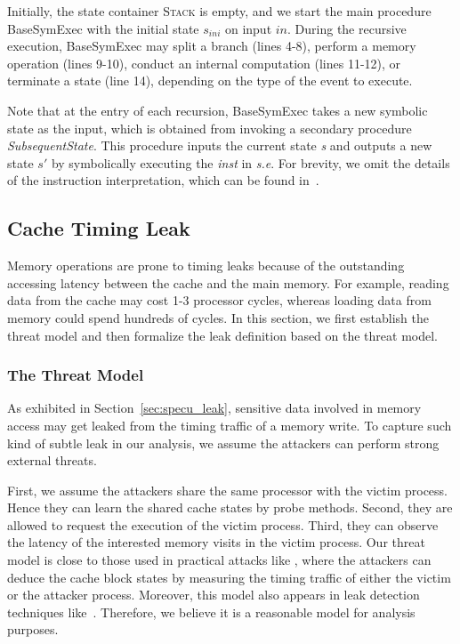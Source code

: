 \documentclass[sigconf,screen]{acmart}
\newcommand{\SymExec}{\textsf{BaseSymExec} }
\begin{document}
Initially, the state container \textsc{Stack} is empty, and we start the main 
procedure \SymExec with the initial state $\mathit{s_{ini}}$ on input $\mathit{in}$.
During the recursive execution, \SymExec may split a branch (lines 4-8), perform 
a memory operation (lines 9-10), conduct an internal computation (lines 11-12), 
or terminate a state (line 14), depending on the type of the event to execute.


Note that at the entry of each recursion, \SymExec takes a new symbolic state 
as the input, which is obtained from invoking a secondary procedure 
\textit{SubsequentState}. This procedure inputs the current state \textit{s} 
and outputs a new state $s'$ by symbolically executing the \textit{inst} in 
\textit{s.e}. For brevity, we omit the details of the instruction interpretation, 
which can be found in~\cite{CadarDE08,PasareanuR10}.



\subsection{Cache Timing Leak}
\label{sec:leak}

Memory operations are prone to timing leaks because of the outstanding accessing 
latency between the cache and the main memory. For example, reading data from the 
cache may cost 1-3 processor cycles, whereas loading data from memory could spend 
hundreds of cycles. In this section, we first establish the threat model and then 
formalize the leak definition based on the threat model.


\subsubsection{The Threat Model}
\label{sec:threat}

As exhibited in Section~\ref{sec:specu_leak}, sensitive data involved in memory 
access may get leaked from the timing traffic of a memory write. To capture such 
kind of subtle leak in our analysis, we assume the attackers can perform strong 
external threats. 


First, we assume the attackers share the same processor with the victim process. 
Hence they can learn the shared cache states by probe methods. Second, they are 
allowed to request the execution of the victim process. Third, they can observe 
the latency of the interested memory visits in the victim process. Our threat 
model is close to those used in practical attacks like
\cite{OsvikST06,YaromF14,DisselkoenKPT17}, where the attackers can deduce the 
cache block states by measuring the timing traffic of either the victim or the 
attacker process. Moreover, this model also appears in leak detection techniques 
like~\cite{WangWLZW17,DoychevK17,WichelmannMES18,BrotzmanLZTK2018}. Therefore, 
we believe it is a reasonable model for analysis purposes.
\end{document}
